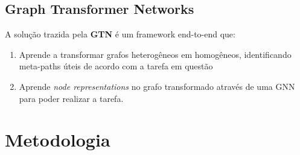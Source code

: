 \documentclass[12pt,notheorems,hyperref={pdfauthor=whatever}]{beamer}
\begin{document}

\subsection{Graph Transformer Networks}
\begin{frame}
    A solução trazida pela \textbf{GTN} é um framework end-to-end que:
    \begin{enumerate}
        \item Aprende a transformar grafos heterogêneos em homogêneos, identificando meta-paths úteis de acordo com a tarefa em questão
        \item Aprende \textit{node representations} no grafo transformado através de uma GNN para poder realizar a tarefa.        
    \end{enumerate}
\end{frame}


\section{Metodologia}




    

    

\end{document}

